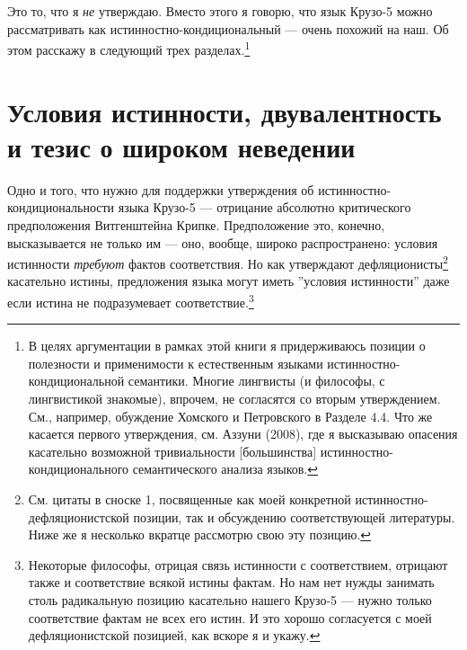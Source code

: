 \documentclass[11pt]{book}
\begin{document}
Это то, что я \textit{не} утверждаю. Вместо этого я говорю, что язык Крузо-5 можно рассматривать как истинностно-кондициональный --- очень похожий на наш. Об этом расскажу в следующий трех разделах.\footnote{В целях аргументации в рамках этой книги я придерживаюсь позиции о полезности и применимости к естественным языками истинностно-кондициональной семантики. Многие лингвисты (и философы, с лингвистикой знакомые), впрочем, не согласятся со вторым утверждением. См., например, обуждение Хомского и Петровского в Разделе 4.4. Что же касается первого утверждения, см. Аззуни (2008), где я высказываю опасения касательно возможной тривиальности [большинства] истинностно-кондиционального семантического анализа языков.}

\section{Условия истинности, двувалентность и тезис о широком неведении}

Одно и того, что нужно для поддержки утверждения об истинностно-кондициональности языка Крузо-5 --- отрицание абсолютно критического предположения Витгенштейна Крипке. Предположение это, конечно, высказывается не только им --- оно, вообще, широко распространено: условия истинности \textit{требуют} фактов соответствия. Но как утверждают дефляционисты\footnote{См. цитаты в сноске 1, посвященные как моей конкретной истинностно-дефляционистской позиции, так и обсуждению соответствующей литературы. Ниже же я несколько вкратце рассмотрю свою эту позицию.} касательно истины, предложения языка могут иметь ''условия истинности'' даже если истина не подразумевает соответствие.\footnote{Некоторые философы, отрицая связь истинности с соответствием, отрицают также и соответствие всякой истины фактам. Но нам нет нужды занимать столь радикальную позицию касательно нашего Крузо-5 --- нужно только соответствие фактам не всех его истин. И это хорошо согласуется с моей дефляционистской позицией, как вскоре я и укажу.}
\end{document}
